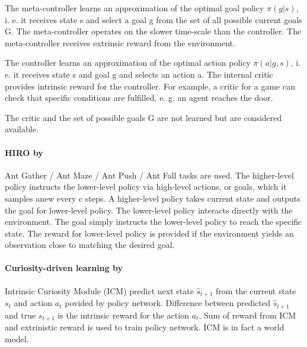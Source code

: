 \documentclass[acmsmall, nonacm]{acmart}
\begin{document}
The meta-controller learns an approximation of the optimal goal policy $\pi(g|s)$, i. e. it receives state s and select a goal g from the set of all possible current goals G. The meta-controller operates on the slower time-scale than the controller. The meta-controller receives extrinsic reward from the environment.

The controller learns an approximation of the optimal action policy $\pi(a|g,s)$, i. e. it receives state s and goal g and selects an action a. The internal critic provides intrinsic reward for the controller. For example, a critic for a game can check that specific conditions are fulfilled, e. g. an agent reaches the door.

The critic and the set of possible goals G are not learned but are considered available.


\paragraph{HIRO by~\citet{Nachum2018DataEfficientHR}} %
\label{par:hiro}

Ant Gather / Ant Maze / Ant Push / Ant Fall tasks are used. The higher-level policy instructs the lower-level policy via high-level actions, or goals, which it samples anew every c steps. A higher-level policy takes current state and outputs the goal for lower-level policy. The lower-level policy interacts directly with the environment. The goal simply instructs the lower-level policy to reach the specific state. The reward for lower-level policy is provided if the environment yields an observation close to matching the desired goal.


\paragraph{Curiosity-driven learning by~\citet{pathak_curiosity-driven_2017}} %
\label{par:curiosity_driven_rl}

Intrinsic Curiosity Module (ICM) predict next state $\hat{s}_{t+1}$ from the current state $s_t$ and action $a_t$ povided by policy network. Difference between predicted $\hat{s}_{t+1}$ and true $s_{t+1}$ is the intrinsic reward for the action $a_t$. Sum of reward from ICM and extrinistic reward is used to train policy network. ICM is in fact a world model.

\end{document}
